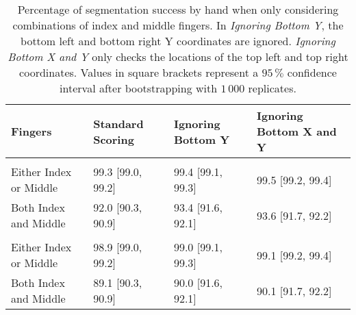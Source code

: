 \documentclass[]{article}
\begin{document}
\begin{table}[!h]

\caption{\label{tab:twoinch-per-hand-index-middle-ci}Percentage of segmentation success by hand when only considering combinations of index and middle fingers. In \textit{Ignoring Bottom Y}, the bottom left and bottom right Y coordinates are ignored. \textit{Ignoring Bottom X and Y} only checks the locations of the top left and top right coordinates. Values in square brackets represent a \(95\,\%\) confidence interval after bootstrapping with \(1\,000\) replicates.}
\centering
\begin{tabular}{llll}
\toprule
Fingers & Standard Scoring & Ignoring Bottom Y & Ignoring Bottom X and Y\\
\midrule
\addlinespace[0.3em]
\multicolumn{4}{l}{\textbf{Right}}\\
\rowcolor{gray!6}  \hspace{1em}Either Index or Middle & 99.3 [99.0, 99.2] & 99.4 [99.1, 99.3] & 99.5 [99.2, 99.4]\\
\hspace{1em}Both Index and Middle & 92.0 [90.3, 90.9] & 93.4 [91.6, 92.1] & 93.6 [91.7, 92.2]\\
\addlinespace[0.3em]
\multicolumn{4}{l}{\textbf{Left}}\\
\rowcolor{gray!6}  \hspace{1em}Either Index or Middle & 98.9 [99.0, 99.2] & 99.0 [99.1, 99.3] & 99.1 [99.2, 99.4]\\
\hspace{1em}Both Index and Middle & 89.1 [90.3, 90.9] & 90.0 [91.6, 92.1] & 90.1 [91.7, 92.2]\\
\bottomrule
\end{tabular}
\end{table}
\end{document}
